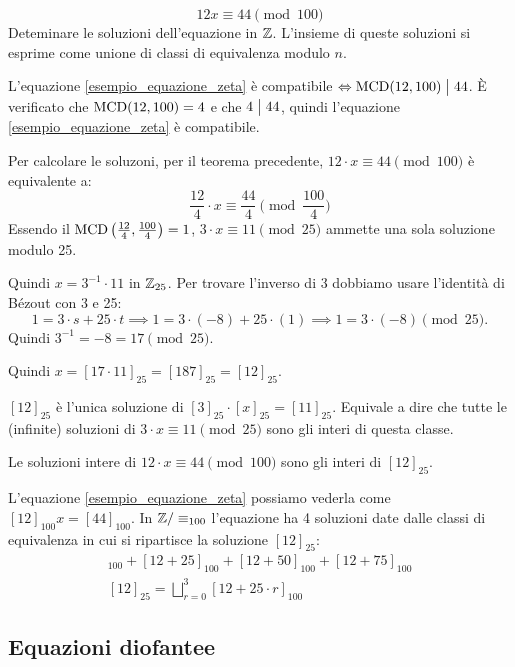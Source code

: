 \begin{exmp}
\begin{equation}\label{esempio_equazione_zeta}
12 x \equiv 44 \pmod{100}
\end{equation}
Deteminare le soluzioni dell'equazione in $\mathbb{Z}$. L'insieme di queste soluzioni si esprime come unione di classi di equivalenza modulo $n$.

L'equazione \ref{esempio_equazione_zeta} \`e compatibile $\Leftrightarrow \operatorname{MCD}(12, 100) \bigm| 44$. \`E verificato che $\operatorname{MCD}(12, 100) = 4$ e che $4 \bigm| 44$, quindi l'equazione \ref{esempio_equazione_zeta} \`e compatibile.

Per calcolare le soluzoni, per il teorema precedente, $12 \cdot x \equiv 44 \pmod{100}$ \`e equivalente a:
\[
\frac{12}{4} \cdot x \equiv \frac{44}{4} \pmod{\frac{100}{4}}
\]
Essendo il $\operatorname{MCD} \left( \frac{12}{4}, \frac{100}{4} \right) = 1$, $3 \cdot x \equiv 11 \pmod{25}$ ammette una sola soluzione modulo 25.

Quindi $x = 3^{-1} \cdot 11$ in $\mathbb{Z}_{25}$. Per trovare l'inverso di 3 dobbiamo usare l'identit\`a di B\'ezout con 3 e 25:
\[
1 = 3 \cdot s + 25 \cdot t \implies 1 = 3 \cdot (-8) + 25 \cdot (1) \implies
1 = 3 \cdot (-8) \pmod{25}.
\]
Quindi $3^{-1} = - 8 = 17 \pmod{25}$.

Quindi $x = [17 \cdot 11]_{25} = [187]_{25} = [12]_{25}$.

$[12]_{25}$ \`e l'unica soluzione di $[3]_{25} \cdot [x]_{25} = [11]_{25}$. Equivale a dire che tutte le (infinite) soluzioni di $3 \cdot x \equiv 11 \pmod{25}$ sono gli interi di questa classe.

Le soluzioni intere di $12 \cdot x \equiv 44 \pmod{100}$ sono gli interi di $[12]_{25}$.

L'equazione \ref{esempio_equazione_zeta} possiamo vederla come $[12]_{100} x = [44]_{100}$. In $\mathbb{Z} / \equiv_{100}$ l'equazione ha 4 soluzioni date dalle classi di equivalenza in cui si ripartisce la soluzione $[12]_{25}$:
\begin{gather*}
[12]_{100} + [12 + 25]_{100} + [12 + 50]_{100} + [12 + 75]_{100} \\
[12]_{25} = \bigsqcup_{r = 0}^{3} [12 + 25 \cdot r]_{100}
\end{gather*}
\end{exmp}

\subsection{Equazioni diofantee}

